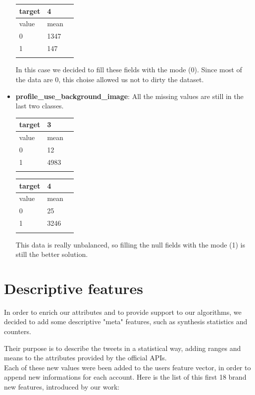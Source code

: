 \begin{itemize}
\begin{center}
		\begin{tabular}{lll}
			\\target&4\\
			\hline\hline
			value&mean\\
			\hline\hline
			0&1347\\
			1&147\\\hline\\
		\end{tabular}
	\end{center}
	In this case we decided to fill these fields with the mode (0). Since most of the data are 0, this choise allowed us not to dirty the dataset.
	
	
	\item[\PencilRight]\textbf{profile\_use\_background\_image}: All the missing values are still in the last two classes.
	\begin{center}
		\begin{tabular}{lll}
			\\target&3\\
			\hline\hline
			value&mean\\
			\hline\hline
			0&12\\
			1&4983\\\hline\\
		\end{tabular}
		
		\begin{tabular}{lll}
			\\target&4\\
			\hline\hline
			value&mean\\
			\hline\hline
			0&25\\
			1&3246\\\hline\\
		\end{tabular}
	\end{center}
	This data is really unbalanced, so filling the null fields with the mode (1) is still the better solution.
	
\end{itemize}
\section{Descriptive features}

In order to enrich our attributes and to provide support to our algorithms, we decided to add some descriptive "meta" features, such as synthesis statistics and counters.

Their purpose is to describe the tweets in a statistical way, adding ranges and means to the attributes provided by the official APIs.\\
Each of these new values were been added to the users feature vector, in order to append new informations for each account.
Here is the list of this first 18 brand new features, introduced by our work:

